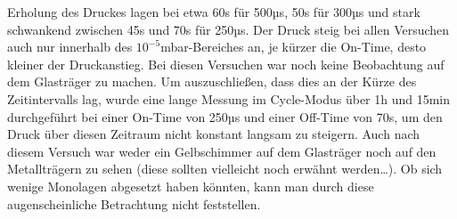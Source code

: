Erholung des Druckes lagen bei etwa 60s für 500µs, 50s für 300µs und stark schwankend zwischen 45s
und 70s für 250µs. Der Druck steig bei allen Versuchen auch nur innerhalb des
$10^{-5}$mbar-Bereiches an, je kürzer die On-Time, desto kleiner der Druckanstieg. Bei diesen
Versuchen war noch keine Beobachtung auf dem Glasträger zu machen. Um auszuschließen, dass dies an
der Kürze des Zeitintervalls lag, wurde eine lange Messung im Cycle-Modus über 1h und 15min
durchgeführt bei einer On-Time von 250µs und einer Off-Time von 70s, um den Druck über diesen
Zeitraum nicht konstant langsam zu steigern. Auch nach diesem Versuch war weder ein Gelbschimmer
auf dem Glasträger noch auf den Metallträgern zu sehen (diese sollten vielleicht noch erwähnt
werden\ldots). Ob sich wenige Monolagen abgesetzt haben könnten, kann man durch diese
augenscheinliche Betrachtung nicht feststellen.\\
